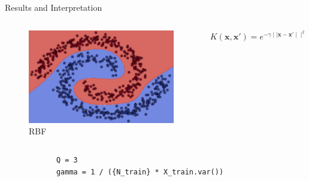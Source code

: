 \documentclass[9.5pt]{beamer}
\begin{document}
\begin{frame}[fragile]{Results and Interpretation}
\begin{columns}[onlytextwidth]
            \centering
            \begin{figure}
                \centering
                \includegraphics[width=\linewidth]{image-20220624192258535}
                \caption{RBF}
            \end{figure}
            \[K(\mathbf{x}, \mathbf{x}') = e^{-\gamma \mid\mid \mathbf{x}-\mathbf{x}' \mid\mid^2}\]
        \end{columns}

        \bigskip
        \bigskip

        \scriptsize
        \begin{verbatim}
            Q = 3
            gamma = 1 / ({N_train} * X_train.var())
        \end{verbatim}
    \end{frame}
\end{document}
